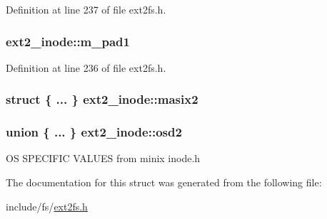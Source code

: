 \-Definition at line 237 of file ext2fs.\-h.

\hypertarget{structext2__inode_a875f06cf47bcc50962ca285678acac12}{
\subsubsection[{m\-\_\-pad1}]{ {\bf ext2\-\_\-inode\-::m\-\_\-pad1}}}\label{structext2__inode_a875f06cf47bcc50962ca285678acac12}


\-Definition at line 236 of file ext2fs.\-h.

\hypertarget{structext2__inode_a6b09c4b78d4967c98cc3e1f26ceb06e9}{
\subsubsection[{masix2}]{\setlength{\rightskip}{0pt plus 5cm}struct \{ ... \}   {\bf ext2\-\_\-inode\-::masix2}}}\label{structext2__inode_a6b09c4b78d4967c98cc3e1f26ceb06e9}
\hypertarget{structext2__inode_a8f843a0bb55e122ab36dca68734ce2f2}{
\subsubsection[{osd2}]{\setlength{\rightskip}{0pt plus 5cm}union \{ ... \}   {\bf ext2\-\_\-inode\-::osd2}}}\label{structext2__inode_a8f843a0bb55e122ab36dca68734ce2f2}
\-O\-S \-S\-P\-E\-C\-I\-F\-I\-C \-V\-A\-L\-U\-E\-S from minix inode.\-h 

\-The documentation for this struct was generated from the following file\-:\begin{DoxyCompactItemize}
\item 
include/fs/\hyperlink{ext2fs_8h}{ext2fs.\-h}\end{DoxyCompactItemize}
